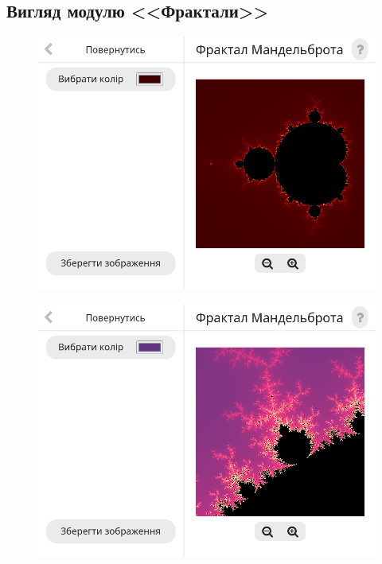 \documentclass[oneside,14pt]{extarticle}
\begin{document}
\begin{normalsize}
	\subsection{Вигляд модулю <<Фрактали>>}
	\begin{figure}[H]
		\centering
		\includegraphics[scale=0.6]{11}
		\caption{}
	\end{figure}
	
	\begin{figure}[H]
		\centering
		\includegraphics[scale=0.6]{12}
		\caption{}
	\end{figure}
	

\end{normalsize}
\end{document}

